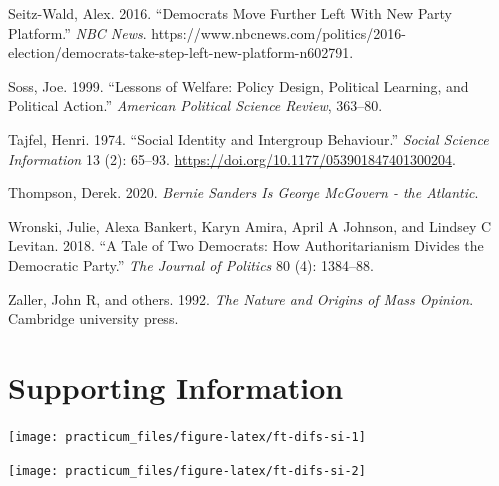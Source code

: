 \documentclass[
]{article}
\newlength{\cslhangindent}
\newenvironment{CSLReferences}[2] %
 {%
  \setlength{\parindent}{0pt}
  \ifodd #1 \everypar{\setlength{\hangindent}{\cslhangindent}}\ignorespaces\fi
  \ifnum #2 > 0
  \setlength{\parskip}{#2\baselineskip}
  \fi
 }%
 {}
\begin{document}
\begin{CSLReferences}{1}{0}
\leavevmode{}%
Seitz-Wald, Alex. 2016. {``Democrats {Move Further Left With New Party Platform}.''} \emph{NBC News}. https://www.nbcnews.com/politics/2016-election/democrats-take-step-left-new-platform-n602791.

\leavevmode{}%
Soss, Joe. 1999. {``Lessons of Welfare: Policy Design, Political Learning, and Political Action.''} \emph{American Political Science Review}, 363--80.

\leavevmode{}%
Tajfel, Henri. 1974. {``Social Identity and Intergroup Behaviour.''} \emph{Social Science Information} 13 (2): 65--93. \url{https://doi.org/10.1177/053901847401300204}.

\leavevmode{}%
Thompson, Derek. 2020. \emph{Bernie Sanders Is George {McGovern} - the Atlantic}.

\leavevmode{}%
Wronski, Julie, Alexa Bankert, Karyn Amira, April A Johnson, and Lindsey C Levitan. 2018. {``A Tale of Two Democrats: How Authoritarianism Divides the Democratic Party.''} \emph{The Journal of Politics} 80 (4): 1384--88.

\leavevmode{}%
Zaller, John R, and others. 1992. \emph{The Nature and Origins of Mass Opinion}. {Cambridge university press}.

\end{CSLReferences}

\hypertarget{appendix-appendix}{%
\appendix}


\clearpage

\hypertarget{supporting-information}{%
\section{Supporting Information}\label{supporting-information}}

\begin{center}\texttt{[image: practicum\_files/figure-latex/ft-difs-si-1]} \end{center}

\begin{center}\texttt{[image: practicum\_files/figure-latex/ft-difs-si-2]} \end{center}
\end{document}
